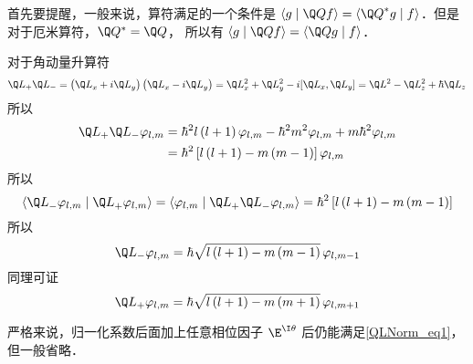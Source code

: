 


首先要提醒，一般来说，算符满足的一个条件是 $\left\langle {g}
 \mathrel{\left | {\vphantom {g {\Q Qf}}}
 \right. \kern-\nulldelimiterspace}
 {{\Q Qf}} \right\rangle  = \left\langle {{{{\Q Q}^ * }g}}
 \mathrel{\left | {\vphantom {{{{\Q Q}^ * }g} f}}
 \right. \kern-\nulldelimiterspace}
 {f} \right\rangle $．但是对于厄米算符，${\Q Q^ * } = \Q Q$， 所以有 $\left\langle {g}
 \mathrel{\left | {\vphantom {g {\Q Qf}}}
 \right. \kern-\nulldelimiterspace}
 {{\Q Qf}} \right\rangle  = \left\langle {{\Q Qg}}
 \mathrel{\left | {\vphantom {{\Q Qg} f}}
 \right. \kern-\nulldelimiterspace}
 {f} \right\rangle $．

对于角动量升算符
\begin{equation}
{\Q L_ + }{\Q L_ - } = \left( {{{\Q L}_x} + i{{\Q L}_y}} \right)\left( {{{\Q L}_x} - i{{\Q L}_y}} \right) = \Q L_x^2 + \Q L_y^2 - i[{\Q L_x},{\Q L_y}] = {\Q L^2} - \Q L_z^2 + \hbar {\Q L_z}
\end{equation} 
所以
\begin{equation}\begin{aligned}
{\Q L_ + }{\Q L_ - }{\varphi_{l,m}} &= {\hbar ^2}l\left( {l + 1} \right){\varphi_{l,m}} - {\hbar ^2}{m^2}{\varphi_{l,m}} + m{\hbar ^2}{\varphi_{l,m}} \\
&= {\hbar ^2}\left[ {l\left( {l + 1} \right) - m\left( {m - 1} \right)} \right]{\varphi_{l,m}}
\end{aligned}\end{equation} 
所以
\begin{equation}\label{QLNorm_eq1}
\left\langle {{{{\Q L}_ - }{\varphi_{l,m}}}}
 \mathrel{\left | {\vphantom {{{{\Q L}_ - }{\varphi_{l,m}}} {{{\Q L}_ + }{\varphi_{l,m}}}}}
 \right. \kern-\nulldelimiterspace}
 {{{{\Q L}_ + }{\varphi_{l,m}}}} \right\rangle  = \left\langle {{{\varphi_{l,m}}}}
 \mathrel{\left | {\vphantom {{{\varphi_{l,m}}} {{{\Q L}_ + }{{\Q L}_ - }{\varphi_{l,m}}}}}
 \right. \kern-\nulldelimiterspace}
 {{{{\Q L}_ + }{{\Q L}_ - }{\varphi_{l,m}}}} \right\rangle  = {\hbar ^2}\left[ {l\left( {l + 1} \right) - m\left( {m - 1} \right)} \right]
\end{equation} 
所以
\begin{equation}
{\Q L_ - }{\varphi_{l,m}} = \hbar \sqrt {l\left( {l + 1} \right) - m\left( {m - 1} \right)} \,{\varphi_{l,m - 1}}
\end{equation}
同理可证
\begin{equation}
{\Q L_ + }{\varphi_{l,m}} = \hbar \sqrt {l\left( {l + 1} \right) - m\left( {m + 1} \right)} \,{\varphi_{l,m + 1}}
\end{equation} 

严格来说，归一化系数后面加上任意相位因子 ${\E^{\I \theta }}$ 后仍能满足\autoref{QLNorm_eq1}， 但一般省略．



